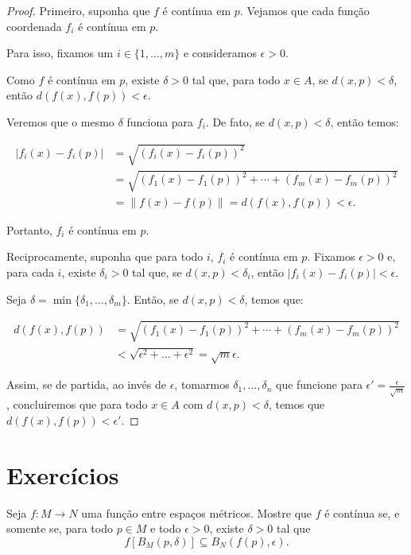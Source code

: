 \begin{proof}
    Primeiro, suponha que $f$ é contínua em $p$.
    Vejamos que cada função coordenada $f_i$ é contínua em $p$.
    
    Para isso, fixamos um $i \in \{1, \dots, m\}$ e consideramos $\epsilon>0$.

    Como $f$ é contínua em $p$, existe $\delta>0$ tal que, para todo $x \in A$, se $d(x, p) < \delta$, então $d(f(x), f(p)) < \epsilon$.

    Veremos que o mesmo $\delta$ funciona para $f_i$.
    De fato, se $d(x, p) < \delta$, então temos:

    \begin{align*}
        |f_i(x) - f_i(p)| &= \sqrt{(f_i(x) - f_i(p))^2} \\
        &= \sqrt{(f_1(x) - f_1(p))^2 + \cdots + (f_m(x) - f_m(p))^2} \\
        &= \|f(x) - f(p)\| = d(f(x), f(p)) < \epsilon.
    \end{align*}

    Portanto, $f_i$ é contínua em $p$.

    Reciprocamente, suponha que para todo $i$, $f_i$ é contínua em $p$.
    Fixamos $\epsilon>0$ e, para cada $i$, existe $\delta_i>0$ tal que, se $d(x, p) < \delta_i$, então $|f_i(x) - f_i(p)| < \epsilon$.

    Seja $\delta = \min\{\delta_1, \ldots, \delta_m\}$. Então, se $d(x, p) < \delta$, temos que:

    \begin{align*}
        d(f(x), f(p)) &= \sqrt{(f_1(x) - f_1(p))^2 + \cdots + (f_m(x) - f_m(p))^2} \\
        &< \sqrt{\epsilon^2+\dots+\epsilon^2}= \sqrt{m}\epsilon.
    \end{align*}

    Assim, se de partida, ao invés de $\epsilon$, tomarmos $\delta_1, \dots, \delta_n$ que funcione para $\epsilon'=\frac{\epsilon}{\sqrt{m}}$, concluiremos que para todo $x \in A$ com $d(x, p) < \delta$, temos que $d(f(x), f(p)) < \epsilon'$.
\end{proof}

\section*{Exercícios}

\begin{exercise}
    Seja $f:M\rightarrow N$ uma função entre espaços métricos.
    Mostre que $f$ é contínua se, e somente se, para todo $p\in M$ e todo $\epsilon>0$, existe $\delta>0$ tal que
    \[
        f[B_M(p,\delta)]\subseteq B_N(f(p),\epsilon).
    \]
\end{exercise}


